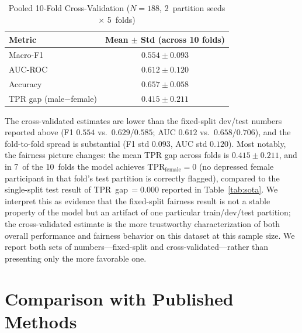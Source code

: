 \documentclass[5p,twocolumn]{elsarticle}
\begin{document}
\begin{table}[t]
\centering
\renewcommand{\arraystretch}{1.15}
\caption{Pooled 10-Fold Cross-Validation ($N{=}188$, 2~partition seeds
$\times$ 5~folds)}
\label{tab:kfold}
\footnotesize
\begin{tabular}{lc}
\toprule
\textbf{Metric} & \textbf{Mean $\pm$ Std (across 10 folds)} \\
\midrule
Macro-F1  & $0.554 \pm 0.093$ \\
AUC-ROC   & $0.612 \pm 0.120$ \\
Accuracy  & $0.657 \pm 0.058$ \\
TPR gap (male$-$female) & $0.415 \pm 0.211$ \\
\bottomrule
\end{tabular}
\end{table}

The cross-validated estimates are lower than the fixed-split dev/test
numbers reported above (F1 $0.554$ vs.\ $0.629$/$0.585$; AUC $0.612$
vs.\ $0.658$/$0.706$), and the fold-to-fold spread is substantial
(F1 std $0.093$, AUC std $0.120$). Most notably, the fairness picture
changes: the mean TPR gap across folds is $0.415\pm0.211$, and in
7~of the 10~folds the model achieves $\text{TPR}_\text{female}=0$
(no depressed female participant in that fold's test partition is
correctly flagged), compared to the single-split test result of
TPR~gap\,$=0.000$ reported in Table~\ref{tab:sota}. We interpret this
as evidence that the fixed-split fairness result is not a stable
property of the model but an artifact of one particular
train/dev/test partition; the cross-validated estimate is the more
trustworthy characterization of both overall performance and fairness
behavior on this dataset at this sample size. We report both sets of
numbers---fixed-split and cross-validated---rather than presenting
only the more favorable one.

\section{Comparison with Published Methods}
\label{sec:sota}
\end{document}
